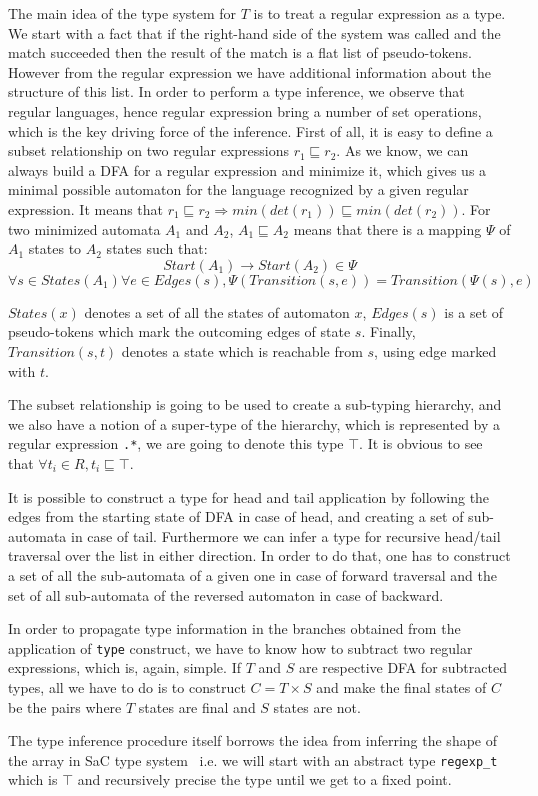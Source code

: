 The main idea of the type system for $T$ is to treat a regular
expression as a type.  We start with a fact that if the 
right-hand side of the system was called and the match succeeded
then the result of the match is a flat list of pseudo-tokens.
However from the regular expression we have additional information
about the structure of this list.  In order to perform a type 
inference, we observe that regular languages, hence regular 
expression bring a number of set operations, which is the key
driving force of the inference.  First of all, it is easy to
define a subset relationship on two regular expressions
$r_1 \sqsubseteq r_2$.  As we know, we can always build a DFA for
a regular expression and minimize it, which gives us a minimal
possible automaton for the language recognized by a given regular
expression.  It means that $r_1 \sqsubseteq r_2 \Rightarrow 
min (det (r_1)) \sqsubseteq min (det (r_2))$.  For two minimized 
automata $A_1$ and $A_2$, $A_1 \sqsubseteq A_2$ means that there
is a mapping $\Psi$ of $A_1$ states to $A_2$ states such that:
\[
    Start (A_1) \to Start (A_2) \in \Psi
\]
\[
    \forall s \in States (A_1) \forall e \in Edges (s),
    \Psi (Transition (s, e)) = Transition (\Psi (s), e)
\]

$States (x)$ denotes a set of all the states of automaton $x$,
$Edges (s)$ is a set of pseudo-tokens which mark the outcoming
edges of state $s$.  Finally, $Transition (s, t)$ denotes a
state which is reachable from $s$, using edge marked with $t$.

The subset relationship is going to be used to create a sub-typing
hierarchy, and we also have a notion of a super-type of
the hierarchy, which is represented by a regular expression \verb|.*|,
we are going to denote this type $\top$.  It is obvious to see that
$\forall t_i \in R, t_i \sqsubseteq \top$.

It is possible to construct a type for head and tail application
by following the edges from the starting state of DFA in case of
head, and creating a set of sub-automata in case of tail.
Furthermore we can infer a type for recursive head/tail traversal
over the list in either direction.  In order to do that, one has
to construct a set of all the sub-automata of a given one in 
case of forward traversal and the set of all sub-automata of
the reversed automaton in case of backward.

In order to propagate type information in the branches obtained from the
application of \verb|type| construct, we have to know how to subtract
two regular expressions, which is, again, simple.  If $T$ and $S$  are
respective DFA for subtracted types, all we have to do is to construct
$C = T \times S$ and make the final states of $C$ be the pairs where $T$
states are final and $S$ states are not. 

The type inference procedure itself borrows the idea from inferring
the shape of the array in SaC type system~\cite{sac2c} i.e. we will
start with an abstract type \verb|regexp_t|
which is $\top$ and recursively precise the type until we get to
a fixed point.







